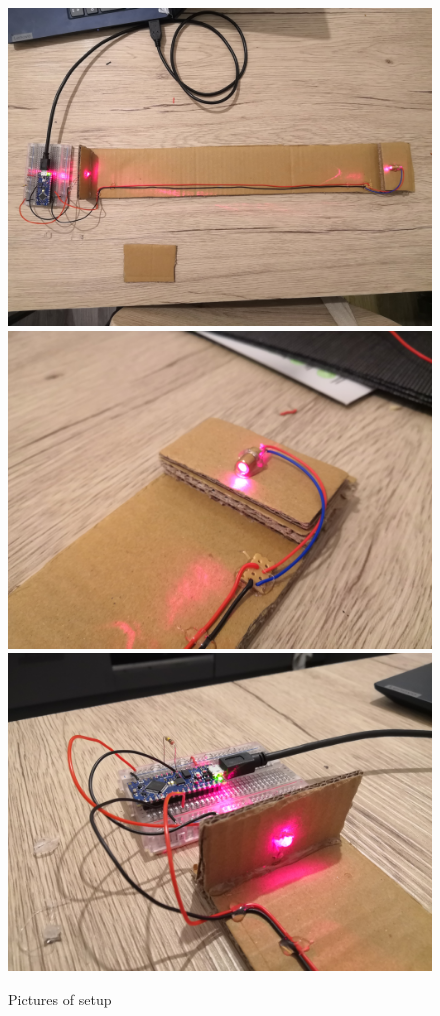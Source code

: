 \documentclass{article}
\begin{document}
\begin{multicols}{2}
\begin{figure}[H]
    \includegraphics[width=\linewidth]{figures/above.jpg}
    \includegraphics[width=\linewidth]{figures/laser.jpg}
    \includegraphics[width=\linewidth]{figures/phototransistor.jpg}
    \caption{Pictures of setup}
    \label{fig:setup-photo}
\end{figure}


\end{multicols}
\end{document}
